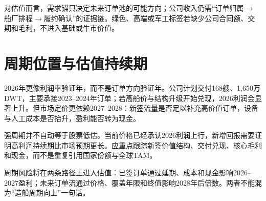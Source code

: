 对估值而言，需求锚只决定未来订单池的可能方向；公司收入仍需“订单归属\(\rightarrow\)船厂排程\(\rightarrow\)履约确认”的证据链。绿色、高端或军工标签若缺少公司合同额、交期和毛利，不进入基础或牛市价值。

\section{周期位置与估值持续期}

2026年更像利润率验证年，而不是订单方向验证年。公司计划交付168艘、1,650万DWT，主要承接2023--2024年订单；若高船价与结构升级开始兑现，2026利润会显著上升。但市场定价更依赖2027--2028：新签流量是否足以补充高价值订单，设备与人工成本是否抬升，盈利能否转为现金。

\begin{keyinsight}[周期判断的行动含义]
强周期并不自动等于股票低估。当前价格已经承认2026利润上行，新增回报需要证明高利润持续期比市场预期更长。应重点跟踪新签价值结构、交付兑现、核心毛利和现金，而不是重复引用国家份额与全球TAM。
\end{keyinsight}

周期风险将在两条路径上进入估值：已签订单通过延期、成本和现金影响2026--2027盈利；未来订单流通过价格、覆盖年限和终值影响2028年后倍数。两者不能混为“造船周期向上”一句话。
